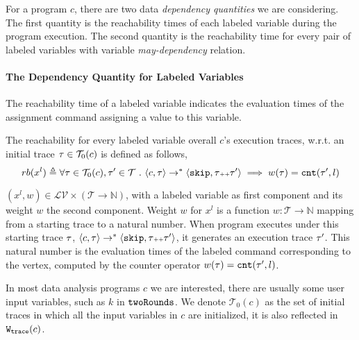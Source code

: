 For a program $c$, there are two data \emph{dependency quantities} we are considering.
The first quantity is the reachability times of each labeled variable during the program execution.
The second quantity is the reachability time for every pair of labeled variables with variable \emph{may-dependency} relation.
\paragraph{The Dependency Quantity for Labeled Variables}
The reachability time of a labeled variable indicates the evaluation times of the assignment command assigning a value to this variable.  
\begin{defn}
  \label{def:adapt-var_reachability}
The reachability for every labeled variable overall $c$'s execution traces,
w.r.t. an initial trace $\mathtt{\tau} \in \mathcal{T}_0(c)$ is defined as follows,
\[
  rb(x^l) \triangleq \forall \mathtt{\tau} \in \mathcal{T}_0(c), \mathtt{\tau}' \in \mathcal{T} ~.~ \langle {c}, \mathtt{\tau} \rangle \to^{*} \langle \mathtt{skip}, \mathtt{\tau}{\scriptscriptstyle ++}\mathtt{\tau}' \rangle 
  \implies w(\mathtt{\tau}) = \mathtt{cnt}(\mathtt{\tau}', l) 
  \]
\end{defn}
%
$(x^l, w) \in \mathcal{LV} \times (\mathcal{T} \to \mathbb{N})$,
with a labeled variable as first component and
its weight $w$ the second component.
Weight $w$ for
$x^l$ is a function $w : \mathcal{T} \to \mathbb{N}$
mapping from a starting trace to a natural number.
When program executes under this starting trace $\mathtt{\tau}$,
$\langle {c}, \mathtt{\tau} \rangle \to^{*} \langle \mathtt{skip}, \mathtt{\tau}{\scriptscriptstyle ++}\mathtt{\tau}' \rangle $, it generates an execution trace $\mathtt{\tau}'$.
This natural number is the evaluation times of the labeled command corresponding to the vertex, 
computed by the counter operator $w(\mathtt{\tau}) = \mathtt{cnt}(\mathtt{\tau}', l)$.


In most data analysis programs $c$ we are interested, there are usually some user input variables, such as $k$ in $\mathtt{twoRounds}$. 
We denote $\mathcal{T}_0(c)$ as the set of initial traces in which all the input variables in $c$ are initialized, it is also reflected in $\mathtt{{W_{trace}}}({c})$.    
